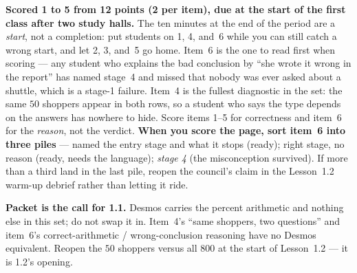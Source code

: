 \documentclass[10pt]{article}
\begin{document}
\begin{teachernote}[Homework]
\textbf{Scored 1 to 5 from 12 points (2 per item), due at the start of the first class after two study
halls.} The ten minutes at the end of the period are a \emph{start}, not a completion: put
students on 1, 4, and~6 while you can still catch a wrong start, and let 2, 3, and~5 go home.
Item~6 is the one to read first when scoring --- any student who explains the bad conclusion
by ``she wrote it wrong in the report'' has named stage~4 and missed that nobody was ever
asked about a shuttle, which is a stage-1 failure. Item~4 is the fullest diagnostic in the
set: the same $50$ shoppers appear in both rows, so a student who says the type depends on the
answers has nowhere to hide. Score items 1--5 for correctness and item~6 for the \emph{reason},
not the verdict. \textbf{When you score the page, sort item~6 into three piles} --- named the
entry stage and what it stops (ready); right stage, no reason (ready, needs the language);
\emph{stage 4} (the misconception survived). If more than a third land in the last pile,
reopen the council's claim in the Lesson~1.2 warm-up debrief rather than letting it ride.

\textbf{Packet is the call for 1.1.} Desmos carries the percent arithmetic and nothing else in
this set; do not swap it in. Item~4's ``same shoppers, two questions'' and item~6's
correct-arithmetic / wrong-conclusion reasoning have no Desmos equivalent. Reopen the $50$
shoppers versus all $800$ at the start of Lesson~1.2 --- it is 1.2's opening.
\end{teachernote}
\end{document}
